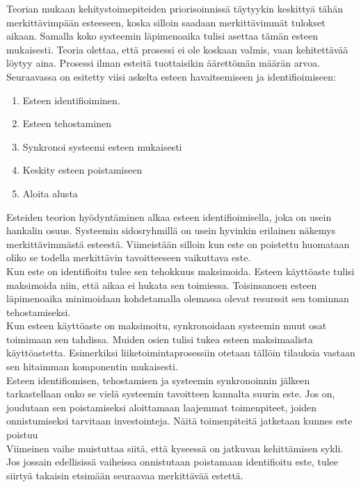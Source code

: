 \documentclass[finnish,12pt,a4paper,pdftex]{article}
\begin{document}
Teorian mukaan kehitystoimepiteiden priorisoinnissä täytyykin keskittyä tähän merkittävimpään esteeseen, koska silloin saadaan merkittävimmät tulokset aikaan. Samalla koko systeemin läpimenoaika tulisi asettaa tämän esteen mukaisesti. Teoria olettaa, että prosessi ei ole koskaan valmis, vaan kehitettävää löytyy aina. Prosessi ilman esteitä tuottaisikin äärettömän määrän arvoa. Seuraavassa on esitetty viisi askelta esteen havaitsemiseen ja identifioimiseen:

\begin{enumerate}
\setlength{\itemsep}{0pt}
    \item Esteen identifioiminen.
    \item Esteen tehostaminen
    \item Synkronoi systeemi esteen mukaisesti
    \item Keskity esteen poistamiseen
    \item Aloita alusta
\end{enumerate}

Esteiden teorion hyödyntäminen alkaa esteen identifioimisella, joka on usein hankalin osuus. Systeemin sidosryhmillä on usein hyvinkin erilainen näkemys merkittävimmästä esteestä. Viimeistään silloin kun este on poistettu huomataan oliko se todella merkittävin tavoitteeseen vaikuttava este.\\

Kun este on identifioitu tulee sen tehokkuus maksimoida. Esteen käyttöaste tulisi maksimoida niin, että aikaa ei hukata sen toimiessa. Toisinsanoen esteen läpimenoaika minimoidaan kohdetamalla olemassa olevat resurssit sen tominnan tehostamiseksi.\\

Kun esteen käyttöaste on maksimoitu, synkronoidaan systeemin muut osat toimimaan sen tahdissa. Muiden osien tulisi tukea esteen maksimaalista käyttöastetta. Esimerkiksi liiketoimintaprosessiin otetaan tällöin tilauksia vastaan sen hitaimman komponentin mukaisesti.\\

Esteen identifiomisen, tehostamisen ja systeemin synkronoinnin jälkeen tarkastellaan onko se vielä systeemin tavoitteen kannalta suurin este. Jos on, joudutaan sen poistamiseksi aloittamaan laajemmat toimenpiteet, joiden onnistumiseksi tarvitaan investointeja. Näitä toimenpiteitä jatketaan kunnes este poistuu\\

Viimeinen vaihe muistuttaa siitä, että kyseessä on jatkuvan kehittämisen sykli. Jos jossain edellisissä vaiheissa onnistutaan poistamaan identifioitu este, tulee siirtyä takaisin etsimään seuraavaa merkittävää estettä.\\
\end{document}
